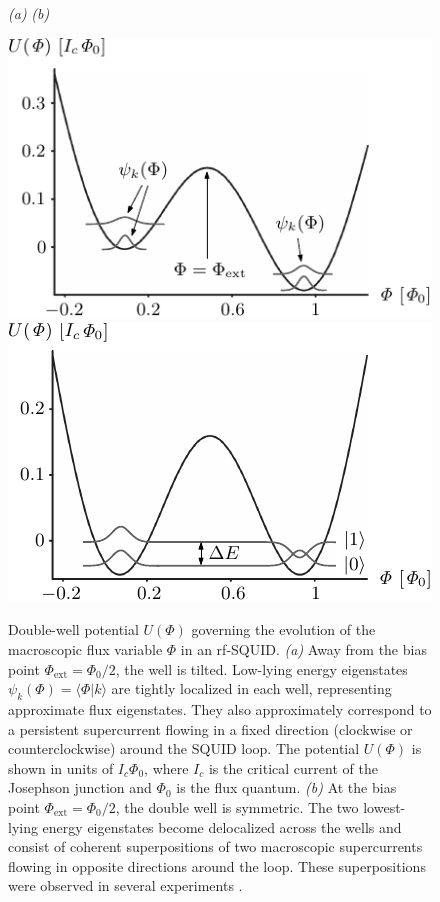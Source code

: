 \documentclass[3p,sort&compress]{elsarticle}
\newcommand{\braket}[2]{\ensuremath{{\langle #1}|{#2 \rangle}}}
\begin{document}
\begin{figure}
{\footnotesize \hspace{1cm} \emph{(a)} \hspace{6.8cm} \emph{(b)} }

\vspace{.2cm}

  \centering
\includegraphics[scale=0.85]{squidpot0.pdf} \hspace{1cm}\includegraphics[scale=0.85]{biaspt.pdf}
\caption{Double-well potential $U(\Phi)$ governing the evolution of the macroscopic flux variable $\Phi$ in an rf-SQUID. \emph{(a)} Away from the bias point $\Phi_\text{ext} = \Phi_0/2$, the well is tilted. Low-lying energy eigenstates $\psi_k(\Phi) =\braket{\Phi}{k}$ are tightly localized in each well, representing approximate flux eigenstates. They also approximately correspond to a persistent supercurrent flowing in a fixed direction (clockwise or counterclockwise) around the SQUID loop. The potential $U(\Phi)$ is shown in units of $I_c \Phi_0$, where $I_c$ is the critical current of the Josephson junction and $\Phi_0$ is the flux quantum. \emph{(b)} At the bias point $\Phi_\text{ext} = \Phi_0/2$, the double well is symmetric. The two lowest-lying energy eigenstates become delocalized across the wells and consist of coherent superpositions of two macroscopic supercurrents flowing in opposite directions around the loop. These superpositions were observed in several experiments \cite{Friedman:2000:rr,Wal:2000:om,Chiorescu:2003:ta,Ilichev:2003:tv}.}
\label{fig:squidpot0} 
\end{figure}
\end{document}
